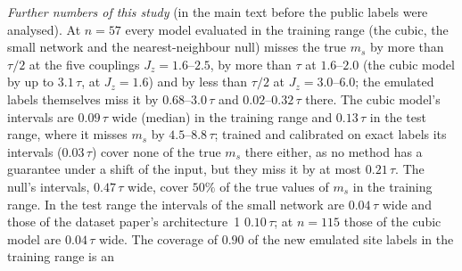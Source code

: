 \documentclass[aps,prx,onecolumn,10pt,nofootinbib,longbibliography,floatfix]{revtex4-2}
\theoremstyle{remark}
\newcommand{\Jz}{J_z}
\newcommand{\ms}{m_s}
\begin{document}
\emph{Further numbers of this study} (in the main text before the public labels were analysed). At $n=57$ every %
model evaluated in the training range (the cubic, the small network and the nearest-neighbour null) misses the
true $\ms$ by more than $\tau/2$ at the five couplings $\Jz=1.6$--$2.5$, by more than $\tau$ at $1.6$--$2.0$ %
(the cubic model by up to $3.1\,\tau$, at $\Jz=1.6$) and by %
less than $\tau/2$ at $\Jz=3.0$--$6.0$; the emulated labels themselves miss it by $0.68$--$3.0\,\tau$ and %
$0.02$--$0.32\,\tau$ there. The cubic model's intervals are $0.09\,\tau$ wide (median) in the training range and %
$0.13\,\tau$ in the test range, where it misses $\ms$ by $4.5$--$8.8\,\tau$; trained and calibrated on exact %
labels its intervals ($0.03\,\tau$) cover none of the true $\ms$ there either, as no method has a guarantee under %
a shift of the input, but they miss it by at most $0.21\,\tau$. The null's intervals, $0.47\,\tau$ wide, cover %
$50\%$ of the true values of $\ms$ in the training range. In the test range the intervals of the small network %
are $0.04\,\tau$ wide and those of the dataset paper's %
architecture~1 %
$0.10\,\tau$; at $n=115$ those of the cubic %
model are $0.04\,\tau$ wide. The coverage of $0.90$ of the new emulated site labels in the training range is an %
\end{document}
